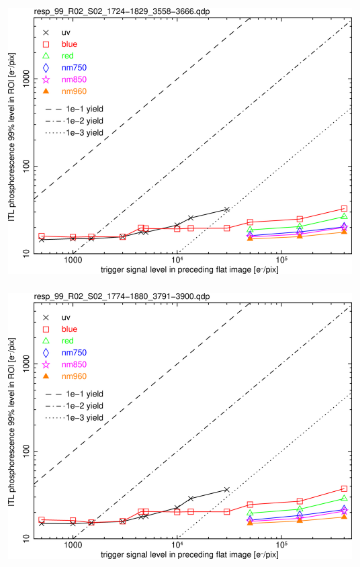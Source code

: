 \begin{figure}[!htbp]
\centering
\begin{subfigure}{0.45\textwidth}    
  \centering
  \includegraphics[width=\textwidth]{figures/phosphorescence-survey/phos_resp/resp_99_R02_S02_1724-1829_3558-3666.png}    
\end{subfigure}
\newline
\centering
\begin{subfigure}{0.45\textwidth}    
  \centering
  \includegraphics[width=\textwidth]{figures/phosphorescence-survey/phos_resp/resp_99_R02_S02_1774-1880_3791-3900.png}    
\end{subfigure}
\newline

\end{figure}
